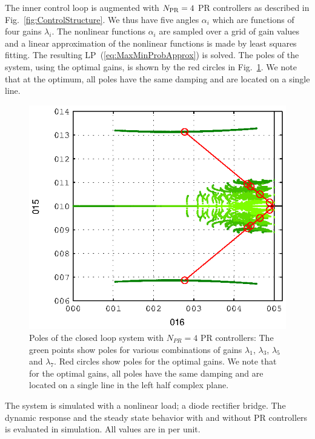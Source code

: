 \documentclass[conference,10pt]{IEEEtran}
\begin{document}
The inner control loop is augmented with $N_{\rm PR} = 4$ PR controllers as described in Fig.~\ref{fig:ControlStructure}. We thus have five
angles $\alpha_i$ which are functions of four gains
$\lambda_i$. The nonlinear functions $\alpha_i$ are sampled over a grid of gain values and a linear approximation of the nonlinear functions is made by least squares fitting. The resulting LP~(\ref{eq:MaxMinProbApprox}) is solved. The poles of the system, using the optimal gains, is shown by the red circles in Fig.~\ref{fig:PolesOptimalExample}.
We note that at the optimum, all poles have the same damping and are located on a single line. %
\begin{figure}[!h]
\centering

\includegraphics{fig/root_locus}
\caption{Poles of the closed loop system with $N_{PR}=4$ PR controllers: The green points show poles for various combinations of gains $\lambda_1$, $\lambda_3$, $\lambda_5$ and $\lambda_7$. Red circles show poles for the optimal gains.
We note that for the optimal gains, all poles have the same damping and are located on a single line in the left half complex plane.
}
\label{fig:PolesOptimalExample}
\end{figure}


The system is simulated with a nonlinear load; a diode rectifier bridge. The dynamic response and the steady state behavior with and without PR controllers is evaluated in simulation. All values are in per unit.
\end{document}
